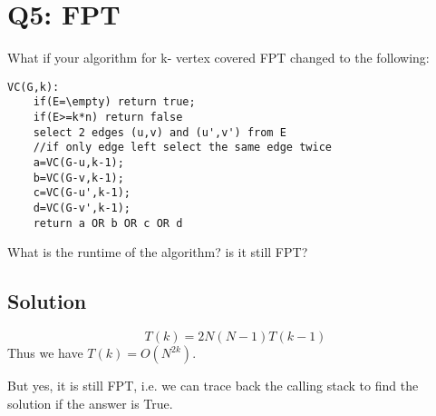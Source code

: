 \section*{Q5: FPT}

What if your algorithm for k- vertex covered FPT changed to the following:

\begin{lstlisting}
VC(G,k):
    if(E=\empty) return true;
    if(E>=k*n) return false
    select 2 edges (u,v) and (u',v') from E
    //if only edge left select the same edge twice
    a=VC(G-u,k-1);
    b=VC(G-v,k-1);
    c=VC(G-u',k-1);
    d=VC(G-v',k-1);
    return a OR b OR c OR d
\end{lstlisting}

What is the runtime of the algorithm? is it still FPT?

\subsection*{Solution}

$$T(k) = 2N(N-1)T(k-1)$$
Thus we have $T(k) = O(N^{2k})$.

But yes, it is still FPT, i.e. we can trace back the calling stack to find the solution if the answer is True.